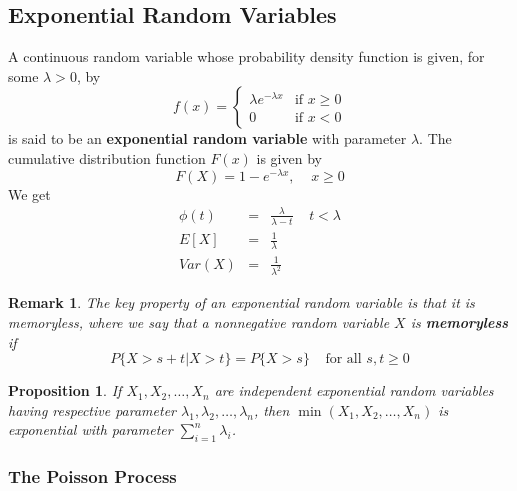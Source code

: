 \documentclass[12pt]{article}
\newtheorem{proposition}[theorem]{Proposition}
\newtheorem{remark}[theorem]{Remark}
\begin{document}
\subsection{Exponential Random Variables}

A continuous random variable whose probability density function is given, for some $\lambda > 0$, by
\begin{equation*}
  f(x) =
  \begin{cases}
    \lambda e^{-\lambda x} & \text{if } x \ge 0 \\
    0 & \text{if } x < 0
  \end{cases}
\end{equation*}
is said to be an \textbf{exponential random variable} with parameter $\lambda$. The cumulative distribution function $F(x)$ is given by
\begin{equation*}
  F(X) = 1 - e^{-\lambda x}, \;\;\;\; x \ge 0
\end{equation*}
We get
\begin{eqnarray*}
  \phi(t) &=& \frac{\lambda}{\lambda - t} \;\;\;\; t < \lambda \\
  E[X] &=& \frac{1}{\lambda} \\
  Var(X) &=& \frac{1}{\lambda^2}
\end{eqnarray*}

\begin{remark}
  The key property of an exponential random variable is that it is memoryless, where we say that a nonnegative random variable $X$ is \textbf{memoryless} if
  \begin{equation*}
    P\{ X > s+t | X>t \} = P\{ X >s \} \;\;\;\; \text{for all } s,t \ge 0
  \end{equation*}
\end{remark}

\begin{proposition}
  If $X_1,X_2,\dots,X_n$ are independent exponential random variables having respective parameter $\lambda_1, \lambda_2, \dots, \lambda_n$, then $\min(X_1, X_2,\dots,X_n)$ is exponential with parameter $\sum_{i=1}^n \lambda_i$.
\end{proposition}

\subsubsection{The Poisson Process}
\end{document}

